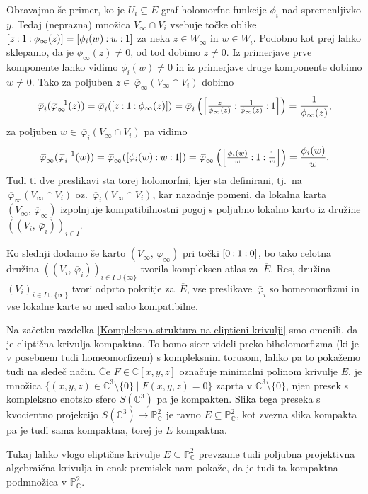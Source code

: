 \documentclass[mat1]{fmfdelo}
\numberwithin{equation}{section}
\newcommand{\C}{\mathbb C}
\newcommand{\PC}{\mathbb{P}^2_\C}
\newcommand{\inv}{^{-1}}
\newcommand{\pcoor}[1]{%
\begingroup\lccode`~=`: \lowercase{\endgroup
\edef~}{\mathbin{\mathchar\the\mathcode`:}\nobreak}%
\left[%
\begingroup
\mathcode`:=\string"8000
#1%
\endgroup
\right]%
}
\newcommand{\olsi}[1]{\,\overline{\!{#1}}} %
\newcommand{\tj}{tj.\ }
\theoremstyle{definition}
\begin{document}
Obravajmo še primer, ko je $U_i \subseteq E$ graf holomorfne funkcije $\phi_i$ nad spremenljivko $y$. Tedaj (neprazna) množica $V_\infty \cap V_i$ vsebuje točke oblike $\pcoor{z : 1 : \phi_\infty(z)} = \pcoor{\phi_i(w) : w : 1}$ za neka $z \in W_\infty$ in $w \in W_i$. Podobno kot prej lahko sklepamo, da je $\phi_\infty(z) \neq 0$, od tod dobimo $z \neq 0$. Iz primerjave prve komponente lahko vidimo $\phi_i(w) \neq 0$ in iz primerjave druge komponente dobimo $w \neq 0$. Tako za poljuben $z \in \olsi{\varphi}_\infty(V_\infty \cap V_i)$ dobimo
\[
    \olsi{\varphi}_i (\olsi{\varphi}_\infty\inv (z)) = 
    \olsi{\varphi}_i (\pcoor{z : 1 : \phi_\infty(z)}) = 
    \olsi{\varphi}_i \left(\pcoor{\tfrac{z}{\phi_\infty(z)} : \tfrac{1}{\phi_\infty(z)} : 1}\right) = 
    \frac{1}{\phi_\infty(z)},
\]
za poljuben $w \in \olsi{\varphi}_i(V_\infty \cap V_i)$ pa vidimo
\[
    \olsi{\varphi}_\infty (\olsi{\varphi}_i\inv(w)) =
    \olsi{\varphi}_\infty (\pcoor{\phi_i(w) : w : 1}) =
    \olsi{\varphi}_\infty \left(\pcoor{\tfrac{\phi_i(w)}{w} : 1 : \tfrac{1}{w}}\right) = 
    \frac{\phi_i(w)}{w}.
\]
Tudi ti dve preslikavi sta torej holomorfni, kjer sta definirani, \tj na $\olsi{\varphi}_\infty(V_\infty \cap V_i)$ oz. $\olsi{\varphi}_i(V_\infty \cap V_i)$, kar nazadnje pomeni, da lokalna karta $(V_\infty, \olsi{\varphi}_\infty)$ izpolnjuje kompatibilnostni pogoj s poljubno lokalno karto iz družine $((V_i, \olsi{\varphi}_i))_{i \in I}$.

Ko slednji dodamo še karto $(V_\infty, \olsi{\varphi}_\infty)$ pri točki $\pcoor{0 : 1 : 0}$, bo tako celotna družina $((V_i,\olsi{\varphi}_i))_{i \in I \cup \{\infty\}}$ tvorila kompleksen atlas za $\olsi{E}$. Res, družina $(V_i)_{i \in I \cup \{\infty\}}$ tvori odprto pokritje za $\olsi{E}$, vse preslikave $\olsi{\varphi}_i$ so homeomorfizmi in vse lokalne karte so med sabo kompatibilne. 

\begin{opomba}
    Na začetku razdelka \ref{Kompleksna struktura na elipticni krivulji} smo omenili, da je eliptična krivulja kompaktna. To bomo sicer videli preko biholomorfizma (ki je v posebnem tudi homeomorfizem) s kompleksnim torusom, lahko pa to pokažemo tudi na sledeč način. Če $F \in \C[x,y,z]$ označuje minimalni polinom krivulje $E$, je množica $\{ (x,y,z) \in \C^3\setminus\{0\} \mid F(x,y,z) = 0\}$ zaprta v $\C^3\setminus\{0\}$, njen presek s kompleksno enotsko sfero $S(\C^3)$ pa je kompakten. Slika tega preseka s kvocientno projekcijo $S(\C^3) \to \PC$ je ravno $E\subseteq \PC$, kot zvezna slika kompakta pa je tudi sama kompaktna, torej je $E$ kompaktna. 
    
    Tukaj lahko vlogo eliptične krivulje $E \subseteq \PC$ prevzame tudi poljubna projektivna algebraična krivulja in enak premislek nam pokaže, da je tudi ta kompaktna podmnožica v $\PC$.
\end{opomba}
\end{document}
